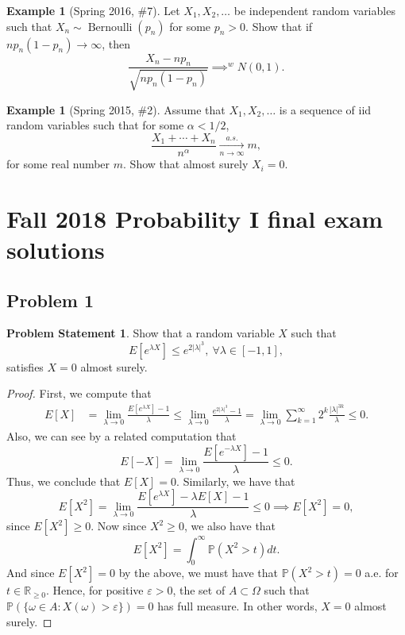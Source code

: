 \documentclass[12pt,reqno]{article}
\theoremstyle{plain}
\theoremstyle{definition}
\newtheorem{example}[theorem]{Example}
\newtheorem{problem}[theorem]{Problem Statement}
\newcommand{\PP}[1]{\ensuremath{\mathbb{P}\left(#1\right)}}
\begin{document}
\begin{example}[Spring 2016, \#7]
Let $X_1,X_2,\ldots$ be independent random variables such that 
$X_n \sim \operatorname{Bernoulli}(p_n)$ for some $p_n > 0$. Show that if 
$np_n(1-p_n) \rightarrow \infty$, then 
\[
\frac{X_n - np_n}{\sqrt{np_n(1-p_n)}} \implies^{w} N(0, 1). 
\]
\end{example} 

\begin{example}[Spring 2015, \#2]
Assume that $X_1,X_2,\ldots$ is a sequence of iid random variables such 
that for some $\alpha < 1/2$,
\[
\frac{X_1+\cdots+X_n}{n^{\alpha}} \xrightarrow[n \rightarrow \infty]{a.s.} m, 
\]
for some real number $m$. Show that almost surely $X_i = 0$. 
\end{example} 


\newpage
\section{Fall 2018 Probability I final exam solutions} 

\subsection{Problem 1}

\begin{problem}
Show that a random variable $X$ such that 
\[
E[e^{\lambda X}] \leq e^{2|\lambda|^3},\ \forall \lambda \in [-1, 1], 
\]
satisfies $X = 0$ almost surely. 
\end{problem}
\begin{proof} 
First, we compute that 
\begin{align*} 
E[X] & = \lim_{\lambda \rightarrow 0} \frac{E[e^{\lambda X}] - 1}{\lambda} 
     \leq \lim_{\lambda \rightarrow 0} \frac{e^{2|\lambda|^3} - 1}{\lambda} 
     = \lim_{\lambda \rightarrow 0} \sum_{k=1}^{\infty} 
     2^k \frac{|\lambda|^{3k}}{\lambda} 
     \leq 0. 
\end{align*} 
Also, we can see by a related computation that 
\[
E[-X] = \lim_{\lambda \rightarrow 0} \frac{E[e^{-\lambda X}] - 1}{\lambda}
     \leq 0. 
\]
Thus, we conclude that $E[X] = 0$. 
Similarly, we have that 
\[
E[X^2] = \lim_{\lambda \rightarrow 0} \frac{E[e^{\lambda X}] - \lambda E[X] -1}{
     \lambda} \leq 0 \implies E[X^2] = 0, 
\]
since $E[X^2] \geq 0$. Now since $X^2 \geq 0$, we also have that 
\[
E[X^2] = \int_0^{\infty} \PP{X^2 > t} dt. 
\]
And since $E[X^2] = 0$ by the above, we must have that $\PP{X^2 > t} = 0$ a.e. 
for $t \in \mathbb{R}_{\geq 0}$. Hence, for positive $\varepsilon > 0$, 
the set of $A \subset \Omega$ such that 
$\PP{\{\omega \in A: X(\omega) > \varepsilon\}} = 0$ has full measure. 
In other words, $X = 0$ almost surely. 
\end{proof} 
\end{document}
